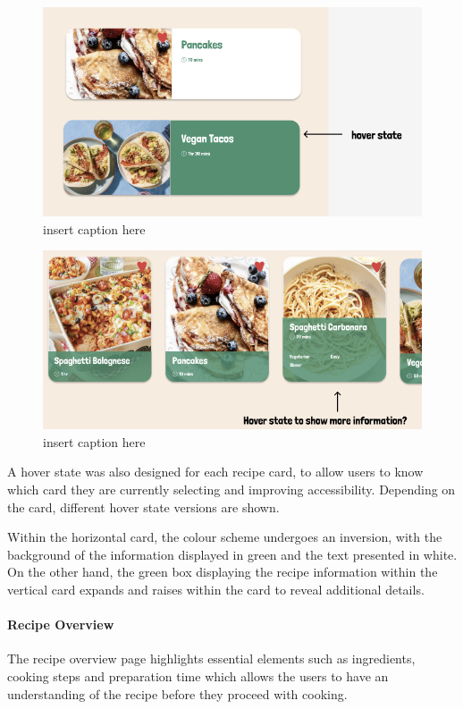 \documentclass{article}
\begin{document}
\begin{figure}[htbp]
  \includegraphics[width=1.0\textwidth]{assets/Version 1 Horizontal Cards.png}
  \centering
  \caption{insert caption here}
\end{figure}

\begin{figure}[htbp]
  \includegraphics[width=1.0\textwidth]{assets/Version 1 Vertical Cards.png}
  \centering
  \caption{insert caption here}
\end{figure}

A hover state was also designed for each recipe card, to allow users to know which card they are currently selecting and improving accessibility. Depending on the card, different hover state versions are shown. 

Within the horizontal card, the colour scheme undergoes an inversion, with the background of the information displayed in green and the text presented in white. On the other hand, the green box displaying the recipe information within the vertical card expands and raises within the card to reveal additional details.
    
\paragraph{Recipe Overview}
The recipe overview page highlights essential elements such as ingredients, cooking steps and preparation time which allows the users to have an understanding of the recipe before they proceed with cooking.
\end{document}
